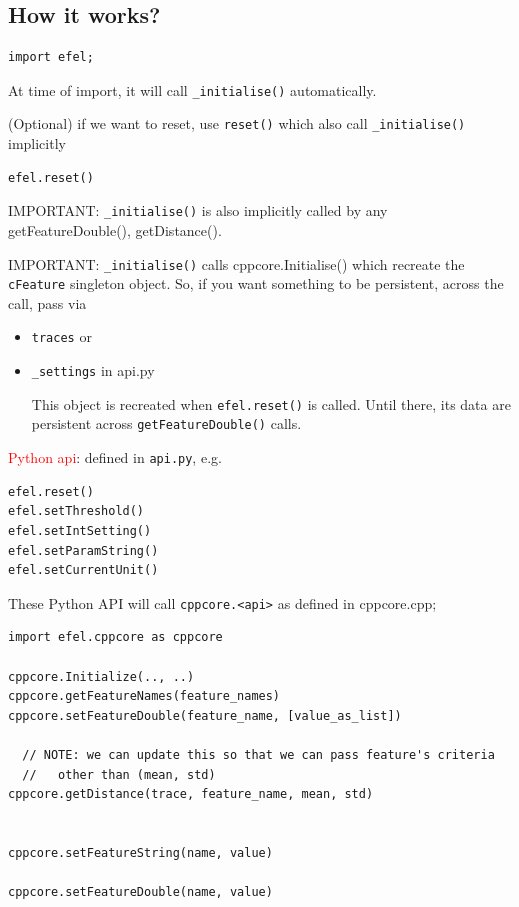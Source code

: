 \subsection{How it works?}


\begin{verbatim}
import efel;
\end{verbatim}
At time of import, it will call \verb!_initialise()!
automatically.


(Optional) if we want to reset, use \verb!reset()! which also call
\verb!_initialise()! implicitly
\begin{verbatim}
efel.reset()
\end{verbatim}

IMPORTANT: \verb!_initialise()! is also implicitly called by any
getFeatureDouble(), getDistance(). 

IMPORTANT: \verb!_initialise()! calls cppcore.Initialise() which recreate the
\verb!cFeature! singleton object. So, if you want something to be
persistent, across the call, pass via 
\begin{itemize}
  \item \verb!traces!  or 

  \item \verb!_settings! in api.py 

This object is recreated when \verb!efel.reset()! is called. Until there, its
data are persistent across \verb!getFeatureDouble()! calls.
\end{itemize}

\textcolor{red}{Python api}: defined in \verb!api.py!, e.g. 
\begin{verbatim}
efel.reset()
efel.setThreshold()
efel.setIntSetting()
efel.setParamString()
efel.setCurrentUnit()
\end{verbatim}
These Python API will call \verb!cppcore.<api>! as defined in
cppcore.cpp;  
\begin{verbatim}
import efel.cppcore as cppcore

cppcore.Initialize(.., ..)
cppcore.getFeatureNames(feature_names)
cppcore.setFeatureDouble(feature_name, [value_as_list])

  // NOTE: we can update this so that we can pass feature's criteria 
  //   other than (mean, std)
cppcore.getDistance(trace, feature_name, mean, std)  


cppcore.setFeatureString(name, value)

cppcore.setFeatureDouble(name, value)
\end{verbatim}

